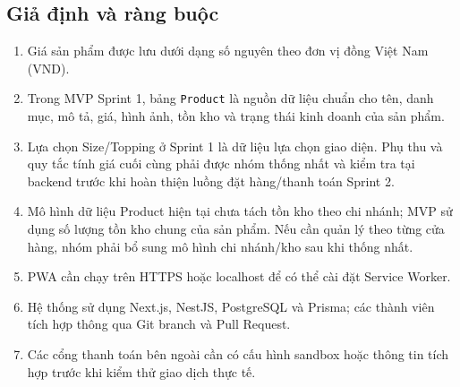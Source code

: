 \subsection{Giả định và ràng buộc}
\begin{enumerate}
    \item Giá sản phẩm được lưu dưới dạng số nguyên theo đơn vị đồng Việt Nam (VND).
    \item Trong MVP Sprint 1, bảng \texttt{Product} là nguồn dữ liệu chuẩn cho tên, danh mục, mô tả, giá, hình ảnh, tồn kho và trạng thái kinh doanh của sản phẩm.
    \item Lựa chọn Size/Topping ở Sprint 1 là dữ liệu lựa chọn giao diện. Phụ thu và quy tắc tính giá cuối cùng phải được nhóm thống nhất và kiểm tra tại backend trước khi hoàn thiện luồng đặt hàng/thanh toán Sprint 2.
    \item Mô hình dữ liệu Product hiện tại chưa tách tồn kho theo chi nhánh; MVP sử dụng số lượng tồn kho chung của sản phẩm. Nếu cần quản lý theo từng cửa hàng, nhóm phải bổ sung mô hình chi nhánh/kho sau khi thống nhất.
    \item PWA cần chạy trên HTTPS hoặc localhost để có thể cài đặt Service Worker.
    \item Hệ thống sử dụng Next.js, NestJS, PostgreSQL và Prisma; các thành viên tích hợp thông qua Git branch và Pull Request.
    \item Các cổng thanh toán bên ngoài cần có cấu hình sandbox hoặc thông tin tích hợp trước khi kiểm thử giao dịch thực tế.
\end{enumerate}

